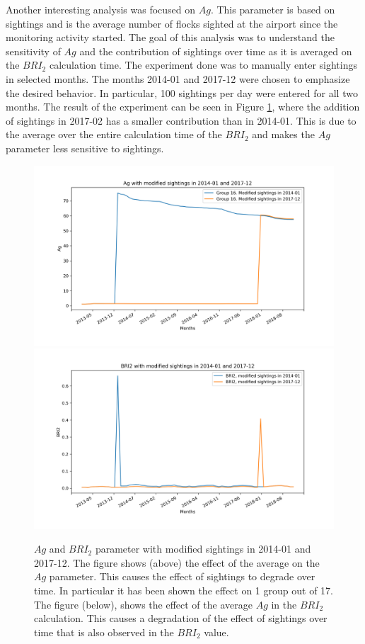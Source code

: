 Another interesting analysis was focused on $Ag$. This parameter is based on sightings and is the average number of flocks sighted at the airport since the monitoring activity started.
The goal of this analysis was to understand the sensitivity of $Ag$ and the contribution of sightings over time as it is averaged on the $BRI_2$ calculation time.
The experiment done was to manually enter sightings in selected months. The months 2014-01 and 2017-12 were chosen to emphasize the desired behavior. In particular, 100 sightings per day were entered for all two months.
The result of the experiment can be seen in Figure \ref{AG_fig}, where the addition of sightings in 2017-02 has a smaller contribution than in 2014-01. This is due to the average over the entire calculation time of the $BRI_2$ and makes the $Ag$ parameter less sensitive to sightings.
\begin{figure}
	\centering
	\includegraphics[width=13cm]{img/AG.png}
	\includegraphics[width=13cm]{img/BRI2_c.png}
	\caption{$Ag$ and $BRI_2$ parameter with modified sightings in 2014-01 and 2017-12. The figure shows (above) the effect of the average on the $Ag$ parameter. This causes the effect of sightings to degrade over time. In particular it has been shown the effect on 1 group out of 17. The figure (below), shows the effect of the average $Ag$ in the $BRI_2$ calculation. This causes a degradation of the effect of sightings over time that is also observed in the $BRI_2$ value.}
	\label{AG_fig}
\end{figure}
